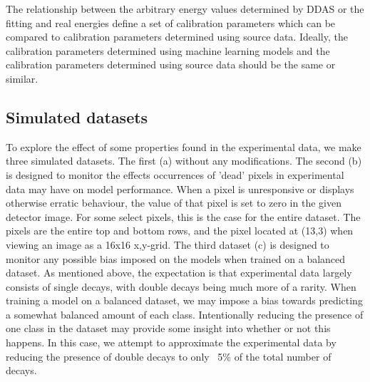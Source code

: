 The relationship between the arbitrary energy values determined by DDAS or the fitting and 
real energies define a set of calibration parameters which can be compared to calibration 
parameters determined using source data. Ideally, the calibration parameters determined using
machine learning models and the calibration parameters determined using source data should 
be the same or similar. 

\subsection{Simulated datasets}\label{sec:experimental-background-data-sim}
To explore the effect of some properties found in the experimental data, we
make three simulated datasets. The first (a) without any modifications.
The second (b) is designed to monitor the effects occurrences of 'dead' pixels in 
experimental data may have on model performance. When a pixel is unresponsive or 
displays otherwise erratic behaviour, the value of that pixel is set to zero in the 
given detector image. For some select pixels, this is the case for the entire dataset. 
The pixels are the entire top and bottom rows, and the pixel located at (13,3) when viewing 
an image as a 16x16 x,y-grid.
The third dataset (c) is designed to monitor any possible bias imposed on the models when trained
on a balanced dataset. As mentioned above, the expectation is that experimental data largely
consists of single decays, with double decays being much more of a rarity. When training a model
on a balanced dataset, we may impose a bias towards predicting a somewhat balanced amount of
each class. Intentionally reducing the presence of one class in the dataset may provide some insight
into whether or not this happens. In this case, we attempt to approximate the experimental data by
reducing the presence of double decays to only ~5\% of the total number of decays.


